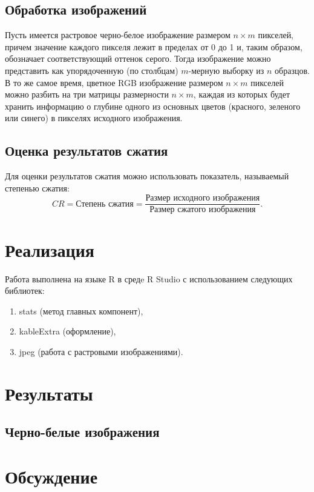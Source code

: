 \documentclass[a4paper]{article}
\begin{document}
\subsection{Обработка изображений}
Пусть имеется растровое черно-белое изображение размером $n\times m$ пикселей, причем значение каждого пикселя лежит в пределах от 0 до 1 и, таким образом, обозначает соответствующий оттенок серого. Тогда изображение можно представить как упорядоченную (по столбцам) $m$-мерную выборку из $n$ образцов.\\
В то же самое время, цветное RGB изображение размером $n\times m$ пикселей можно разбить на три матрицы размерности $n\times m$, каждая из которых будет хранить информацию о глубине одного из основных цветов (красного, зеленого или синего) в пикселях исходного изображения.
\subsection{Оценка результатов сжатия}
Для оценки результатов сжатия можно использовать показатель, называемый степенью сжатия:
\begin{equation}
    CR=\text{Степень сжатия}=\dfrac{\text{Размер исходного изображения}}{\text{Размер сжатого изображения}}.
\end{equation}
\section{Реализация}
Работа выполнена на языке R в средe R Studio с использованием следующих библиотек:
\begin{enumerate}
        \item stats (метод главных компонент),
        \item kableExtra (оформление),
        \item jpeg (работа с растровыми изображениями).
\end{enumerate}
\section{Результаты}
\subsection{Черно-белые изображения}

\section{Обсуждение}
\end{document}
